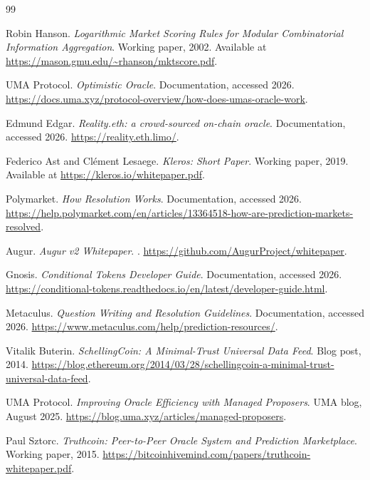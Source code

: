 \documentclass[10pt]{article}
\begin{document}
\begin{thebibliography}{99}

Robin Hanson.
\newblock \emph{Logarithmic Market Scoring Rules for Modular Combinatorial Information Aggregation}.
\newblock Working paper, 2002.
\newblock Available at \url{https://mason.gmu.edu/~rhanson/mktscore.pdf}.

UMA Protocol.
\newblock \emph{Optimistic Oracle}.
\newblock Documentation, accessed 2026.
\newblock \url{https://docs.uma.xyz/protocol-overview/how-does-umas-oracle-work}.

Edmund Edgar.
\newblock \emph{Reality.eth: a crowd-sourced on-chain oracle}.
\newblock Documentation, accessed 2026.
\newblock \url{https://reality.eth.limo/}.

Federico Ast and Cl\'{e}ment Lesaege.
\newblock \emph{Kleros: Short Paper}.
\newblock Working paper, 2019.
\newblock Available at \url{https://kleros.io/whitepaper.pdf}.

Polymarket.
\newblock \emph{How Resolution Works}.
\newblock Documentation, accessed 2026.
\newblock \url{https://help.polymarket.com/en/articles/13364518-how-are-prediction-markets-resolved}.

Augur.
\newblock \emph{Augur v2 Whitepaper}.
.
\newblock \url{https://github.com/AugurProject/whitepaper}.

Gnosis.
\newblock \emph{Conditional Tokens Developer Guide}.
\newblock Documentation, accessed 2026.
\newblock \url{https://conditional-tokens.readthedocs.io/en/latest/developer-guide.html}.

Metaculus.
\newblock \emph{Question Writing and Resolution Guidelines}.
\newblock Documentation, accessed 2026.
\newblock \url{https://www.metaculus.com/help/prediction-resources/}.

Vitalik Buterin.
\newblock \emph{SchellingCoin: A Minimal-Trust Universal Data Feed}.
\newblock Blog post, 2014.
\newblock \url{https://blog.ethereum.org/2014/03/28/schellingcoin-a-minimal-trust-universal-data-feed}.

UMA Protocol.
\newblock \emph{Improving Oracle Efficiency with Managed Proposers}.
\newblock UMA blog, August 2025.
\newblock \url{https://blog.uma.xyz/articles/managed-proposers}.

Paul Sztorc.
\newblock \emph{Truthcoin: Peer-to-Peer Oracle System and Prediction Marketplace}.
\newblock Working paper, 2015.
\newblock \url{https://bitcoinhivemind.com/papers/truthcoin-whitepaper.pdf}.


\end{thebibliography}
\end{document}
